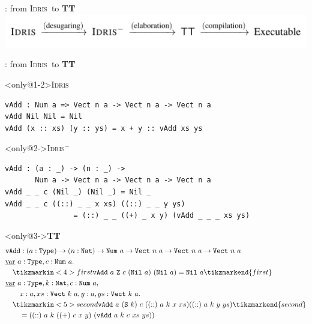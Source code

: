 \documentclass{beamer}
\newcommand\Idris{\textsc{Idris}}
\begin{document}
\begin{frame}{\typetheory: from \Idris\ to \textbf{TT}}
    \includegraphics[width=\textwidth]{pics/phases}
\end{frame}

\begin{frame}[fragile]{\typetheory: from \Idris\ to \textbf{TT}}
    \begin{block}<only@1-2>{\Idris}
        \begin{lstlisting}[basicstyle=\ttfamily\scriptsize]
vAdd : Num a => Vect n a -> Vect n a -> Vect n a
vAdd Nil Nil = Nil
vAdd (x :: xs) (y :: ys) = x + y :: vAdd xs ys
        \end{lstlisting}
    \end{block}
    \vfill

    \begin{block}<only@2->{\Idris$^-$}
    \begin{lstlisting}[basicstyle=\ttfamily\scriptsize]
vAdd : (a : _) -> (n : _) ->
       Num a -> Vect n a -> Vect n a -> Vect n a
vAdd _ _ c (Nil _) (Nil _) = Nil _
vAdd _ _ c ((::) _ _ x xs) ((::) _ _ y ys)
                = (::) _ _ ((+) _ x y) (vAdd _ _ _ xs ys)
    \end{lstlisting}
    \end{block}

    \vfill

    \newcommand\vAdd{\texttt{vAdd}}
    \newcommand\Type{\texttt{Type}}
    \newcommand\Nat{\texttt{Nat}}
    \newcommand\Num{\texttt{Num}}
    \newcommand\Vect{\texttt{Vect}}
    \newcommand\Nil{\texttt{Nil}}

    \begin{block}<only@3->{\textbf{TT}}
    \footnotesize{
        \begin{align*}
            & \vAdd : (a : \Type) \to (n : \Nat) \to \Num\ a \to \Vect\ n\ a \to \Vect\ n\ a \to \Vect\ n\ a \\
            & \ttvar\ a : \Type, c : \Num\ a. \\
            & \quad \tikzmarkin<4>{first}\vAdd\ a\ \texttt{Z}\ c\ (\Nil\ a)\ (\Nil\ a) = \Nil\ a \tikzmarkend{first} \\
            & \ttvar\ a : \Type, k : \Nat, c : \Num\ a, \\
            & \quad \quad x : a, xs : \Vect\ k\ a, y : a, ys : \Vect\ k\ a. \\
            & \quad \tikzmarkin<5>{second}\vAdd\ a\ (\texttt{S}\ k)\ c\ ((::)\ a\ k\ x\ xs) ((::)\ a\ k\ y\ ys)\tikzmarkend{second} \\
            & \quad \quad = ((::)\ a\ k\ ((+)\ c\ x\ y)\ (\vAdd\ a\ k\ c\ xs\ ys)) \\
        \end{align*}
    }
    \end{block}
\end{frame}
\end{document}
